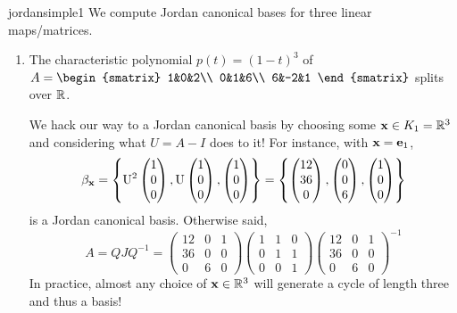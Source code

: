\begin{examples}{}{jordansimple1}
	We compute Jordan canonical bases for three linear maps/matrices.
	\begin{enumerate}
	  \item\label{ex:jordansimple11} The characteristic polynomial $p(t)=(1-t)^3$ of $A=
	  \begin{smatrix}
			1&0&2\\
			0&1&6\\
			6&-2&1
		\end{smatrix}$
		splits over $\mathbb{R}$.\par
		We hack our way to a Jordan canonical basis by choosing some ${\mathbf{x}}\in K_1=\mathbb{R}^3$ and considering what $U=A-I$ does to it! For instance, with ${\mathbf{x}}={\mathbf{e}}_1$,
		\[
			\beta_{\mathbf{x}}
			=\left\{\mathrm{U}^2\begin{pmatrix}1\\0\\0\end{pmatrix},\mathrm{U}\begin{pmatrix}1\\0\\0\end{pmatrix},\begin{pmatrix}1\\0\\0\end{pmatrix}\right\}
			=\left\{\begin{pmatrix}12\\36\\0\end{pmatrix},\begin{pmatrix}0\\0\\6\end{pmatrix},\begin{pmatrix}1\\0\\0\end{pmatrix}\right\}
		\]
		is a Jordan canonical basis. Otherwise said,
		\[
			A=QJQ^{-1}=
			\begin{pmatrix}
				12&0&1\\
				36&0&0\\
				0&6&0
			\end{pmatrix}
			\begin{pmatrix}
				1&1&0\\
				0&1&1\\
				0&0&1
			\end{pmatrix}
			\begin{pmatrix}
				12&0&1\\
				36&0&0\\
				0&6&0
			\end{pmatrix}
			^{-1}
		\] 
		In practice, almost any choice of ${\mathbf{x}}\in\mathbb{R}^3$ will generate a cycle of length three and thus a basis!
		

\end{enumerate}
\end{examples}
